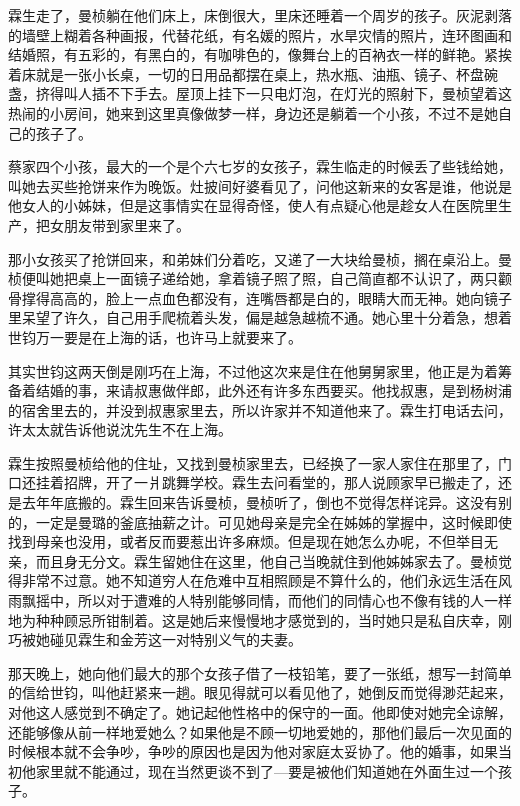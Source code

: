 \par 霖生走了，曼桢躺在他们床上，床倒很大，里床还睡着一个周岁的孩子。灰泥剥落的墙壁上糊着各种画报，代替花纸，有名媛的照片，水旱灾情的照片，连环图画和结婚照，有五彩的，有黑白的，有咖啡色的，像舞台上的百衲衣一样的鲜艳。紧挨着床就是一张小长桌，一切的日用品都摆在桌上，热水瓶、油瓶、镜子、杯盘碗盏，挤得叫人插不下手去。屋顶上挂下一只电灯泡，在灯光的照射下，曼桢望着这热闹的小房间，她来到这里真像做梦一样，身边还是躺着一个小孩，不过不是她自己的孩子了。
\par 蔡家四个小孩，最大的一个是个六七岁的女孩子，霖生临走的时候丢了些钱给她，叫她去买些抢饼来作为晚饭。灶披间好婆看见了，问他这新来的女客是谁，他说是他女人的小姊妹，但是这事情实在显得奇怪，使人有点疑心他是趁女人在医院里生产，把女朋友带到家里来了。
\par 那小女孩买了抢饼回来，和弟妹们分着吃，又递了一大块给曼桢，搁在桌沿上。曼桢便叫她把桌上一面镜子递给她，拿着镜子照了照，自己简直都不认识了，两只颧骨撑得高高的，脸上一点血色都没有，连嘴唇都是白的，眼睛大而无神。她向镜子里呆望了许久，自己用手爬梳着头发，偏是越急越梳不通。她心里十分着急，想着世钧万一要是在上海的话，也许马上就要来了。
\par 其实世钧这两天倒是刚巧在上海，不过他这次来是住在他舅舅家里，他正是为着筹备着结婚的事，来请叔惠做伴郎，此外还有许多东西要买。他找叔惠，是到杨树浦的宿舍里去的，并没到叔惠家里去，所以许家并不知道他来了。霖生打电话去问，许太太就告诉他说沈先生不在上海。
\par 霖生按照曼桢给他的住址，又找到曼桢家里去，已经换了一家人家住在那里了，门口还挂着招牌，开了一爿跳舞学校。霖生去问看堂的，那人说顾家早已搬走了，还是去年年底搬的。霖生回来告诉曼桢，曼桢听了，倒也不觉得怎样诧异。这没有别的，一定是曼璐的釜底抽薪之计。可见她母亲是完全在姊姊的掌握中，这时候即使找到母亲也没用，或者反而要惹出许多麻烦。但是现在她怎么办呢，不但举目无亲，而且身无分文。霖生留她住在这里，他自己当晚就住到他姊姊家去了。曼桢觉得非常不过意。她不知道穷人在危难中互相照顾是不算什么的，他们永远生活在风雨飘摇中，所以对于遭难的人特别能够同情，而他们的同情心也不像有钱的人一样地为种种顾忌所钳制着。这是她后来慢慢地才感觉到的，当时她只是私自庆幸，刚巧被她碰见霖生和金芳这一对特别义气的夫妻。
\par 那天晚上，她向他们最大的那个女孩子借了一枝铅笔，要了一张纸，想写一封简单的信给世钧，叫他赶紧来一趟。眼见得就可以看见他了，她倒反而觉得渺茫起来，对他这人感觉到不确定了。她记起他性格中的保守的一面。他即使对她完全谅解，还能够像从前一样地爱她么？如果他是不顾一切地爱她的，那他们最后一次见面的时候根本就不会争吵，争吵的原因也是因为他对家庭太妥协了。他的婚事，如果当初他家里就不能通过，现在当然更谈不到了—要是被他们知道她在外面生过一个孩子。
